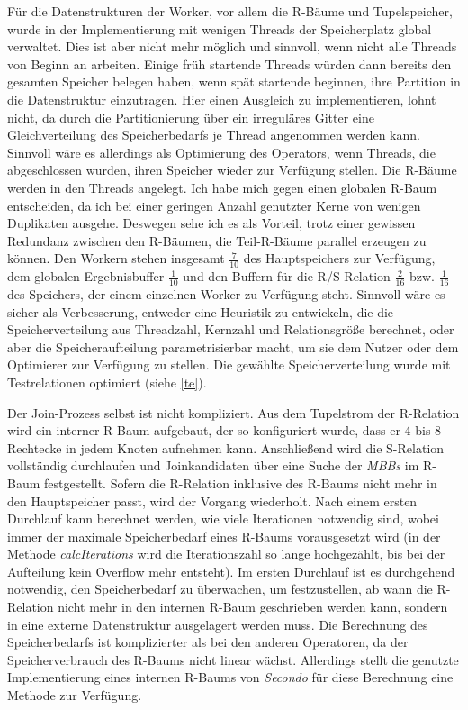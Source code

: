 \documentclass[a4paper,12pt,twoside]{article}
\newcommand{\Fb}[1]{\textit{#1}} %
\begin{document}
Für die Datenstrukturen der Worker, vor allem die R-Bäume und Tupelspeicher, wurde in der Implementierung mit wenigen Threads der Speicherplatz global verwaltet. Dies ist aber nicht mehr möglich und sinnvoll, wenn nicht alle Threads von Beginn an arbeiten. Einige früh startende Threads würden dann bereits den gesamten Speicher belegen haben, wenn spät startende beginnen, ihre Partition in die Datenstruktur einzutragen. Hier einen Ausgleich zu implementieren, lohnt nicht, da durch die Partitionierung über ein irreguläres Gitter eine Gleichverteilung des Speicherbedarfs je Thread angenommen werden kann. Sinnvoll wäre es allerdings als Optimierung des Operators, wenn Threads, die abgeschlossen wurden, ihren Speicher wieder zur Verfügung stellen. Die R-Bäume werden in den Threads angelegt. Ich habe mich gegen einen globalen R-Baum entscheiden, da ich bei einer geringen Anzahl genutzter Kerne von wenigen Duplikaten ausgehe. Deswegen sehe ich es als Vorteil, trotz einer gewissen Redundanz zwischen den R-Bäumen, die Teil-R-Bäume parallel erzeugen zu können. Den Workern stehen insgesamt $\frac{7}{10}$ des Hauptspeichers zur Verfügung, dem globalen Ergebnisbuffer $\frac{1}{10}$ und den Buffern für die R/S-Relation $\frac{2}{16}$ bzw. $\frac{1}{16}$ des Speichers, der einem einzelnen Worker zu Verfügung steht. Sinnvoll wäre es sicher als Verbesserung, entweder eine Heuristik zu entwickeln, die die Speicherverteilung aus Threadzahl, Kernzahl und Relationsgröße berechnet, oder aber die Speicheraufteilung parametrisierbar macht, um sie dem Nutzer oder dem Optimierer zur Verfügung zu stellen. Die gewählte Speicherverteilung wurde mit Testrelationen optimiert (siehe \autoref{te}). 

Der Join-Prozess selbst ist nicht kompliziert. Aus dem Tupelstrom der R-Relation wird ein interner R-Baum aufgebaut, der so konfiguriert wurde, dass er 4 bis 8 Rechtecke in jedem Knoten aufnehmen kann. Anschließend wird die S-Relation vollständig durchlaufen und Joinkandidaten über eine Suche der \Fb{MBBs} im R-Baum festgestellt. Sofern die R-Relation inklusive des R-Baums nicht mehr in den Hauptspeicher passt, wird der Vorgang wiederholt. Nach einem ersten Durchlauf kann berechnet werden, wie viele Iterationen notwendig sind, wobei immer der maximale Speicherbedarf eines R-Baums vorausgesetzt wird (in der Methode \Fb{calcIterations} wird die Iterationszahl so lange hochgezählt, bis bei der Aufteilung kein Overflow mehr entsteht). Im ersten Durchlauf ist es durchgehend notwendig, den Speicherbedarf zu überwachen, um festzustellen, ab wann die R-Relation nicht mehr in den internen R-Baum geschrieben werden kann, sondern in eine externe Datenstruktur ausgelagert werden muss. Die Berechnung des Speicherbedarfs ist komplizierter als bei den anderen Operatoren, da der Speicherverbrauch des R-Baums nicht linear wächst. Allerdings stellt die genutzte Implementierung eines internen R-Baums von \Fb{Secondo} für diese Berechnung eine Methode zur Verfügung.
\end{document}
